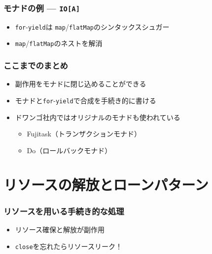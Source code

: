 \begin{frame}
  \frametitle{モナドの例 --- \protect\lstinline|IO[A]|}

  

  \begin{itemize}
    \item<2-> \lstinline|for|-\lstinline|yield|は
    \lstinline|map|/\lstinline|flatMap|のシンタックスシュガー
    \item<3-> \lstinline|map|/\lstinline|flatMap|のネストを解消
  \end{itemize}
\end{frame}

\begin{frame}
  \frametitle{ここまでのまとめ}

  \begin{itemize}
    \item<2-> 副作用をモナドに閉じ込めることができる
    \item<3-> モナドと\lstinline|for|-\lstinline|yield|で合成を手続き的に書ける
    \item<4-> ドワンゴ社内ではオリジナルのモナドも使われている
    \begin{itemize}
      \item<5-> Fujitask（トランザクションモナド）\cite{fujitask,scalamatsuri2016,fujitasksimple}
      \item<5-> Do（ロールバックモナド）
    \end{itemize}
  \end{itemize}

  \begin{center}
  \end{center}  
\end{frame}

\section{リソースの解放とローンパターン}

\begin{frame}
  \frametitle{リソースを用いる手続き的な処理}

  
  \begin{itemize}
    \item<3-> リソース確保と解放が副作用
    \item<4-> \lstinline|close|を忘れたらリソースリーク！
  \end{itemize}
\end{frame}

